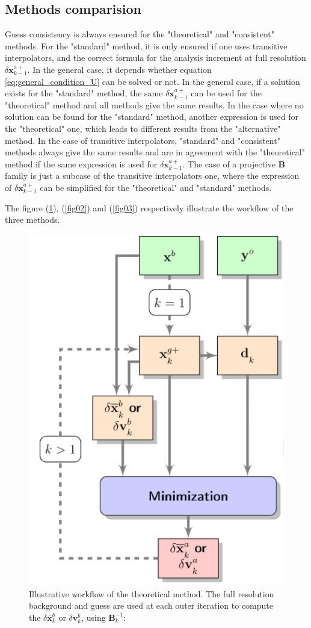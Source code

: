 \documentclass[npg, manuscript]{copernicus}
\begin{document}
\subsection{Methods comparision}
Guess consistency is always ensured for the "theoretical" and "consistent" methods. For the "standard" method, it is only ensured if one uses transitive interpolators, and the correct formula for the analysis increment at full resolution $\delta \mathbf{x}^{a+}_{k-1}$. In the general case, it depends whether equation \eqref{eq:general_condition_U} can be solved or not.
In the general case, if a solution exists for the "standard" method, the same $\delta \mathbf{x}^{a+}_{k-1}$ can be used for the "theoretical" method and all methods give the same results. In the case where no solution can be found for the "standard" method, another expression is used for the "theoretical" one, which leads to different results from the "alternative" method.
In the case of transitive interpolators, "standard" and "consistent" methods always give the same results and are in agreement with the "theoretical" method if the same expression is used for $\delta \mathbf{x}^{a+}_{k-1}$. The case of a projective $\mathbf{B}$ family is just a subcase of the transitive interpolators one, where the expression of $\delta \mathbf{x}^{a+}_{k-1}$ can be simplified for the "theoretical" and "standard" methods.

The figure (\ref{fig01}), (\ref{fig02}) and (\ref{fig03}) respectively illustrate the workflow of the three methods.

\begin{figure}[H]
 \begin{center}
  \includegraphics[width=0.3\linewidth]{fig/th.png}
  \caption{\label{fig01} Illustrative workflow of the theoretical method. The full resolution background and guess are used at each outer iteration to compute the $\delta \overline{\mathbf{x}}^b_k$ or $\delta \mathbf{v}^b_k$, using $\mathbf{B}_k^{-1}$:}
 \end{center}
\end{figure}
\end{document}
